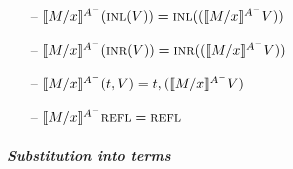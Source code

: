 \begin{itemize}
\smallskip

\item[--] $\rsubsta{M}{x}{(\tinl{V})}{A^-} 
           = \tinl{(\rsubsta{M}{x}{V}{A^-})}$
\item[--] $\rsubsta{M}{x}{(\tinr{V})}{A^-} 
           = \tinr{(\rsubsta{M}{x}{V}{A^-})}$
\item[--] $\rsubsta{M}{x}{(\texistsr{t}{V})}{A^-} 
           = \texistsr{t}{(\rsubsta{M}{x}{V}{A^-})}$
\item[--] $\rsubsta{M}{x}{\tunifr}{A^-} = \tunifr$
\end{itemize}

\paragraph{\it Substitution into terms}


